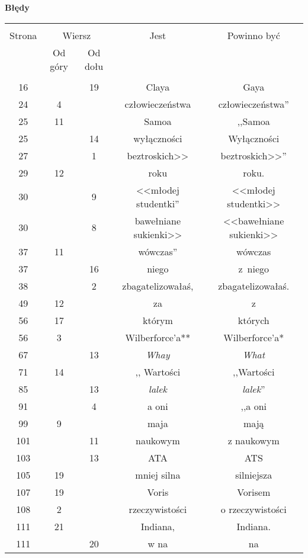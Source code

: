 \documentclass[a4paper]{article}
\newcommand{\tb}{\textbf}
\newcommand{\Center}[1]{\begin{center} #1 \end{center}}
\newcommand{\CenterTB}[1]{\Center{\tb{#1}}}
\begin{document}
\CenterTB{Błędy}
\begin{center}
  \begin{tabular}{|c|c|c|c|c|}
    \hline
    & \multicolumn{2}{c|}{} & & \\
    Strona & \multicolumn{2}{c|}{Wiersz}& Jest & Powinno być \\ \cline{2-3}
    & Od góry & Od dołu &  &  \\ \hline
    & & & & \\
    16 & & 19 & Claya & Gaya \\
    24 & 4 & & człowieczeństwa & człowieczeństwa'' \\
    25 & 11 & & Samoa & ,,Samoa \\ %
    25 & & 14 & wyłączności & Wyłączności \\
    27 & & 1 & beztroskich>> & beztroskich>>'' \\
    29 & 12 & & roku & roku. \\
    30 & & 9 & <<młodej studentki'' & <<młodej studentki>> \\
    30 & & 8 & bawełniane sukienki>> & <<bawełniane sukienki>> \\
    37 & 11 & & wówczas'' & wówczas \\
    37 & & 16 & niego & z~niego \\
    38 & & 2 & zbagatelizowałaś, & zbagatelizowałaś. \\
    49 & 12 & & za & z \\
    56 & 17 & & którym & których \\
    56 & 3 & & Wilberforce'a** & Wilberforce'a* \\
    67 & & 13 & \emph{Whay} & \emph{What} \\
    71 & 14 & & ,, Wartości %
           & ,,Wartości \\ %
    85 & & 13 & \emph{lalek} & \emph{lalek}'' \\
    91 & & 4 & a oni & ,,a oni \\ %
    99 & 9 & & maja & mają \\
    101 & & 11 & naukowym & z naukowym \\
    103 & & 13 & ATA & ATS \\
    105 & 19 & & mniej silna & silniejsza \\
    107 & 19 & & Voris & Vorisem \\
    108 & 2 & & rzeczywistości & o rzeczywistości \\
    111 & 21 & & Indiana, & Indiana. \\
    111 & & 20 & w na & na \\

\end{tabular}
\end{center}
\end{document}
